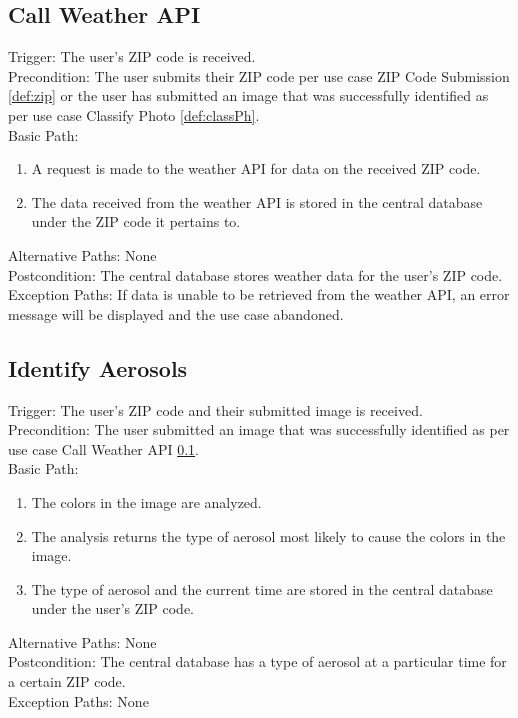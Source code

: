 \documentclass[journal,10pt,draftclsnofoot,onecolumn]{IEEEtran}
\begin{document}
\begin{singlespace}
	
	\subsection{Call Weather API} \label{def:weathAPI}
		Trigger: The user's ZIP code is received.\\
		Precondition: The user submits their ZIP code per use case ZIP Code Submission \ref{def:zip} or the user has submitted an image that was successfully identified as per use case Classify Photo \ref{def:classPh}.\\
		Basic Path:
		\begin{enumerate}
			\item A request is made to the weather API for data on the received ZIP code.
			\item The data received from the weather API is stored in the central database under the ZIP code it pertains to.
		\end{enumerate}
		Alternative Paths: None\\
		Postcondition: The central database stores weather data for the user's ZIP code.\\
		Exception Paths: If data is unable to be retrieved from the weather API, an error message will be displayed and the use case abandoned. 
	\subsection{Identify Aerosols} \label{def:idAero}
		Trigger: The user's ZIP code and their submitted image is received.\\
		Precondition: The user submitted an image that was successfully identified as per use case Call Weather API \ref{def:weathAPI}.\\
		Basic Path:
		\begin{enumerate}
			\item The colors in the image are analyzed.
			\item The analysis returns the type of aerosol most likely to cause the colors in the image.
			\item The type of aerosol and the current time are stored in the central database under the user's ZIP code.
		\end{enumerate}
		Alternative Paths: None\\
		Postcondition: The central database has a type of aerosol at a particular time for a certain ZIP code.\\
		Exception Paths: None


\end{singlespace}
\end{document}
